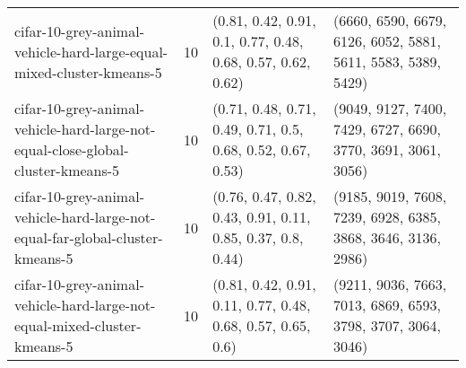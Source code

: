 \begin{longtable}{llll}
                                         cifar-10-grey-animal-vehicle-hard-large-equal-mixed-cluster-kmeans-5 &             10 &                                                                                                                                                                                                                                               (0.81, 0.42, 0.91, 0.1, 0.77, 0.48, 0.68, 0.57, 0.62, 0.62) &                                                                                                                                                                                                                                              (6660, 6590, 6679, 6126, 6052, 5881, 5611, 5583, 5389, 5429) \\
                              cifar-10-grey-animal-vehicle-hard-large-not-equal-close-global-cluster-kmeans-5 &             10 &                                                                                                                                                                                                                                               (0.71, 0.48, 0.71, 0.49, 0.71, 0.5, 0.68, 0.52, 0.67, 0.53) &                                                                                                                                                                                                                                              (9049, 9127, 7400, 7429, 6727, 6690, 3770, 3691, 3061, 3056) \\
                                cifar-10-grey-animal-vehicle-hard-large-not-equal-far-global-cluster-kmeans-5 &             10 &                                                                                                                                                                                                                                               (0.76, 0.47, 0.82, 0.43, 0.91, 0.11, 0.85, 0.37, 0.8, 0.44) &                                                                                                                                                                                                                                              (9185, 9019, 7608, 7239, 6928, 6385, 3868, 3646, 3136, 2986) \\
                                     cifar-10-grey-animal-vehicle-hard-large-not-equal-mixed-cluster-kmeans-5 &             10 &                                                                                                                                                                                                                                               (0.81, 0.42, 0.91, 0.11, 0.77, 0.48, 0.68, 0.57, 0.65, 0.6) &                                                                                                                                                                                                                                              (9211, 9036, 7663, 7013, 6869, 6593, 3798, 3707, 3064, 3046) \\

\end{longtable}
